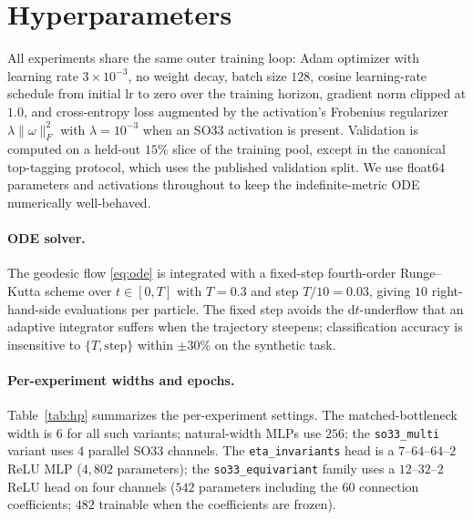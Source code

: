 \documentclass[11pt]{article}
\begin{document}



\appendix

\section{Hyperparameters}
\label{app:hp}

All experiments share the same outer training loop: Adam optimizer with
learning rate $3\times 10^{-3}$, no weight decay, batch size $128$,
cosine learning-rate schedule from initial $\mathrm{lr}$ to zero over
the training horizon, gradient norm clipped at $1.0$, and
cross-entropy loss augmented by the activation's Frobenius regularizer
$\lambda \lVert\omega\rVert_F^2$ with $\lambda = 10^{-3}$ when an SO33
activation is present. Validation is computed on a held-out
$15\%$ slice of the training pool, except in the canonical top-tagging
protocol, which uses the published validation split. We use float$64$
parameters and
activations throughout to keep the indefinite-metric ODE numerically
well-behaved.

\paragraph{ODE solver.} The geodesic flow \eqref{eq:ode} is integrated
with a fixed-step fourth-order Runge--Kutta scheme over $t \in [0, T]$
with $T = 0.3$ and step $T/10 = 0.03$, giving $10$ right-hand-side
evaluations per particle. The fixed step avoids the
$\mathrm{d}t$-underflow that an adaptive integrator suffers when the
trajectory steepens; classification accuracy is insensitive to
$\{T, \mathrm{step}\}$ within $\pm 30\%$ on the synthetic task.

\paragraph{Per-experiment widths and epochs.} Table~\ref{tab:hp}
summarizes the per-experiment settings. The matched-bottleneck width is
$6$ for all such variants; natural-width MLPs use $256$; the
\texttt{so33\_multi} variant uses $4$ parallel SO33 channels. The
\texttt{eta\_invariants} head is a $7$--$64$--$64$--$2$ ReLU MLP
($4{,}802$ parameters); the \texttt{so33\_equivariant} family uses a
$12$--$32$--$2$ ReLU head on four channels ($542$ parameters including
the $60$ connection coefficients; $482$ trainable when the coefficients
are frozen).
\end{document}
